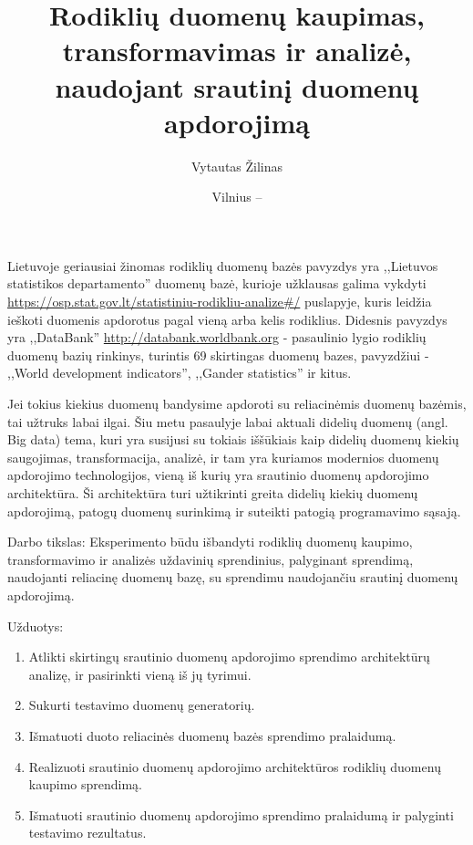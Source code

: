 \documentclass{VUMIFPSkursinis}
\title{Rodiklių duomenų kaupimas, transformavimas ir analizė, naudojant srautinį duomenų apdorojimą}
\author{Vytautas Žilinas}
\date{Vilnius – \the\year}
\begin{document}
	
\maketitle
\cleardoublepage{}
\setcounter{page}{2}

\tableofcontents


Lietuvoje geriausiai žinomas rodiklių duomenų bazės pavyzdys yra ,,Lietuvos statistikos departamento'' duomenų bazė, kurioje užklausas galima vykdyti
\url{https://osp.stat.gov.lt/statistiniu-rodikliu-analize#/} puslapyje, kuris leidžia ieškoti duomenis apdorotus pagal vieną arba kelis rodiklius. 
Didesnis pavyzdys yra ,,DataBank'' \url{http://databank.worldbank.org} - pasaulinio lygio rodiklių duomenų bazių rinkinys, turintis 69 skirtingas 
duomenų bazes, pavyzdžiui - ,,World development indicators'', ,,Gander statistics'' ir kitus\cite{databank-stats}. \par
Jei tokius kiekius duomenų bandysime apdoroti su reliacinėmis duomenų bazėmis, tai užtruks labai ilgai.
Šiu metu pasaulyje labai aktuali didelių duomenų (angl. Big data) tema, kuri yra susijusi su tokiais iššūkiais kaip didelių duomenų kiekių saugojimas, 
transformacija, analizė, ir tam yra kuriamos modernios duomenų apdorojimo technologijos, vieną iš kurių yra srautinio duomenų apdorojimo architektūra.
Ši architektūra turi užtikrinti greita didelių kiekių duomenų apdorojimą, patogų duomenų surinkimą ir suteikti patogią programavimo sąsają.    

Darbo tikslas: Eksperimento būdu išbandyti rodiklių duomenų kaupimo, transformavimo ir analizės uždavinių sprendinius, palyginant sprendimą, naudojanti reliacinę duomenų bazę, su sprendimu naudojančiu srautinį duomenų apdorojimą.

Užduotys:
\begin{enumerate}
    \item Atlikti skirtingų srautinio duomenų apdorojimo sprendimo architektūrų analizę, ir pasirinkti vieną iš jų tyrimui.
    \item Sukurti testavimo duomenų generatorių.
    \item Išmatuoti duoto reliacinės duomenų bazės sprendimo pralaidumą.
    \item Realizuoti srautinio duomenų apdorojimo architektūros rodiklių duomenų kaupimo sprendimą.
    \item Išmatuoti srautinio duomenų apdorojimo sprendimo pralaidumą ir palyginti testavimo rezultatus.
\end{enumerate}
\end{document}
